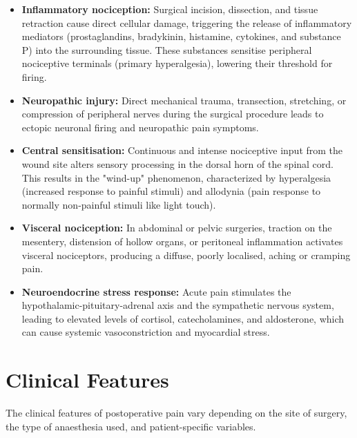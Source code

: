 \begin{itemize}
    \item \textbf{Inflammatory nociception:} Surgical incision, dissection, and tissue retraction cause direct cellular damage, triggering the release of inflammatory mediators (prostaglandins, bradykinin, histamine, cytokines, and substance P) into the surrounding tissue. These substances sensitise peripheral nociceptive terminals (primary hyperalgesia), lowering their threshold for firing.
    \item \textbf{Neuropathic injury:} Direct mechanical trauma, transection, stretching, or compression of peripheral nerves during the surgical procedure leads to ectopic neuronal firing and neuropathic pain symptoms.
    \item \textbf{Central sensitisation:} Continuous and intense nociceptive input from the wound site alters sensory processing in the dorsal horn of the spinal cord. This results in the "wind-up" phenomenon, characterized by hyperalgesia (increased response to painful stimuli) and allodynia (pain response to normally non-painful stimuli like light touch).
    \item \textbf{Visceral nociception:} In abdominal or pelvic surgeries, traction on the mesentery, distension of hollow organs, or peritoneal inflammation activates visceral nociceptors, producing a diffuse, poorly localised, aching or cramping pain.
    \item \textbf{Neuroendocrine stress response:} Acute pain stimulates the hypothalamic-pituitary-adrenal axis and the sympathetic nervous system, leading to elevated levels of cortisol, catecholamines, and aldosterone, which can cause systemic vasoconstriction and myocardial stress.
\end{itemize}

\section*{Clinical Features}
The clinical features of postoperative pain vary depending on the site of surgery, the type of anaesthesia used, and patient-specific variables.


